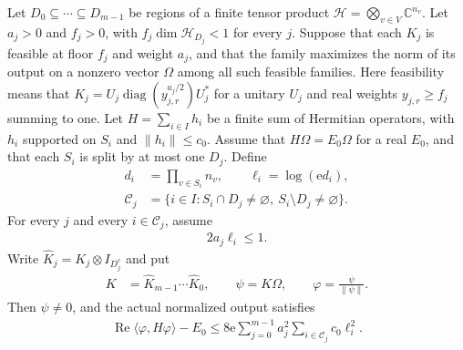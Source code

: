 \begin{theorem}
    \label{thm:filter_max_logarithmic_energy}
    \leanok
    Let $D_0\subseteq\cdots\subseteq D_{m-1}$ be regions of a finite
    tensor product $\mathcal H=\bigotimes_{v\in V}\mathbb C^{n_v}$.
    Let $a_j>0$ and $f_j>0$, with
    $f_j\dim\mathcal H_{D_j}<1$ for every $j$. Suppose that each
    $K_j$ is feasible at floor $f_j$ and weight $a_j$, and that the
    family maximizes the norm of its output on a nonzero vector
    $\Omega$ among all such feasible families. Here feasibility means
    that $K_j=U_j\operatorname{diag}(y_{j,r}^{a_j/2})U_j^*$ for a
    unitary $U_j$ and real weights $y_{j,r}\ge f_j$ summing to one.
    Let $H=\sum_{i\in I}h_i$ be a finite sum of Hermitian operators,
    with $h_i$ supported on $S_i$ and $\lVert h_i\rVert\le c_0$.
    Assume that $H\Omega=E_0\Omega$ for a real $E_0$, and that each
    $S_i$ is split by at most one $D_j$. Define
    \begin{align*}
        d_i          & =\prod_{v\in S_i}n_v,\qquad \ell_i=\log(\mathrm e d_i), \\
        \mathcal C_j & =\{i\in I:S_i\cap D_j\ne\varnothing,
        \ S_i\setminus D_j\ne\varnothing\}.
    \end{align*}
    For every $j$ and every $i\in\mathcal C_j$, assume
    \begin{align*}
        2a_j\ell_i\le1.
    \end{align*}
    Write $\widehat K_j=K_j\otimes I_{D_j^c}$ and put
    \begin{align*}
        K & =\widehat K_{m-1}\cdots\widehat K_0,\qquad
        \psi=K\Omega,\qquad \varphi=\frac{\psi}{\lVert\psi\rVert}.
    \end{align*}
    Then $\psi\ne0$, and the actual normalized output satisfies
    \begin{align*}
        \operatorname{Re}\langle\varphi,H\varphi\rangle-E_0
        \le8\mathrm e\sum_{j=0}^{m-1}a_j^2
        \sum_{i\in\mathcal C_j}c_0\ell_i^2.
    \end{align*}
\end{theorem}
